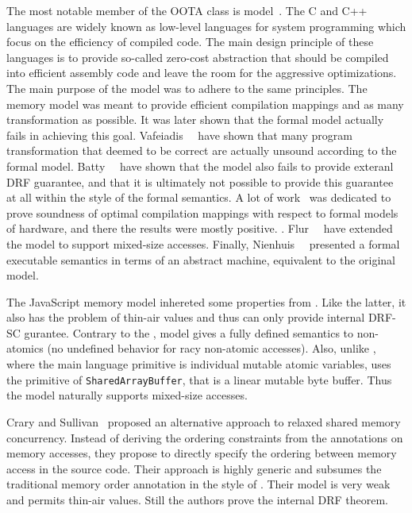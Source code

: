 The most notable member of the OOTA class is \CMM model~\cite{Batty-al:POPL11}.
The C and C++ languages are widely known as low-level languages 
for system programming which focus on the efficiency of compiled code. 
The main design principle of these languages is to provide
so-called zero-cost abstraction that should be compiled 
into efficient assembly code and leave the room 
for the aggressive optimizations. 
The main purpose of the \CMM model was to adhere 
to the same principles. The memory model 
was meant to provide efficient compilation mappings 
and as many transformation as possible.
It was later shown that the formal model actually 
fails in achieving this goal. 
Vafeiadis~\etal~\cite{Vafeiadis-al:POPL15} have shown
that many program transformation that deemed to be correct
are actually unsound according to the formal model. 
Batty~\etal~\cite{Batty-al:ESOP15} have shown that 
the model also fails to provide exteranl DRF guarantee, 
and that it is ultimately not possible to provide this guarantee
at all within the style of the \CMM formal semantics.
A lot of work~\cite{Batty-al:POPL11, Sarkar-al:PLDI12, Batty-al:POPL12, Batty-al:POPL16} 
was dedicated to prove soundness of optimal compilation mappings 
with respect to formal models of hardware, 
and there the results were mostly positive.
. 
Flur~\etal~\cite{Flur-al:POPL17} have extended the model 
to support mixed-size accesses.
Finally, Nienhuis~\etal~\cite{Nienhuis-al:OOPSLA16} presented 
a formal executable semantics in terms of an abstract machine, 
equivalent to the original \CMM model. 

The JavaScript memory model \JSMM inhereted some properties from \CMM.
Like the latter, it also has the problem of thin-air values
and thus can only provide internal DRF-SC gurantee. 
Contrary to the \CMM, \JS model gives a fully defined 
semantics to non-atomics 
(\ie no undefined behavior for racy non-atomic accesses).  
Also, unlike \CMM, where the main language primitive is 
individual mutable atomic variables, \JSMM uses 
the primitive of \texttt{SharedArrayBuffer},
that is a linear mutable byte buffer.
Thus the model naturally supports mixed-size accesses.

Crary and Sullivan~\cite{Crary-Sullivan:POPL15} proposed 
an alternative approach to relaxed shared memory concurrency.
Instead of deriving the ordering constraints from the annotations 
on memory accesses, they propose to directly specify 
the ordering between memory access in the source code. 
Their approach is highly generic and subsumes 
the traditional memory order annotation in the style of \CMM.
Their model is very weak and permits thin-air values. 
Still the authors prove the internal DRF theorem.


